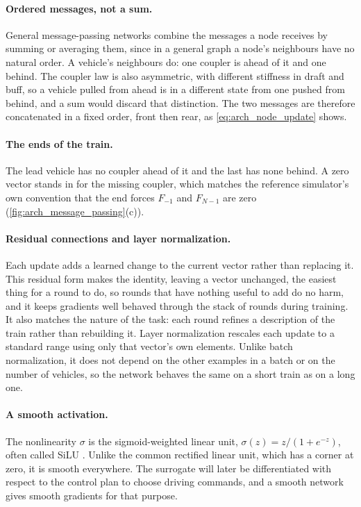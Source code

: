 \paragraph{Ordered messages, not a sum.} General message-passing networks combine the messages a node receives by summing or averaging them, since in a general graph a node's neighbours have no natural order. A vehicle's neighbours do: one coupler is ahead of it and one behind. The coupler law is also asymmetric, with different stiffness in draft and buff, so a vehicle pulled from ahead is in a different state from one pushed from behind, and a sum would discard that distinction. The two messages are therefore concatenated in a fixed order, front then rear, as \cref{eq:arch_node_update} shows.

\paragraph{The ends of the train.} The lead vehicle has no coupler ahead of it and the last has none behind. A zero vector stands in for the missing coupler, which matches the reference simulator's own convention that the end forces $F_{-1}$ and $F_{N-1}$ are zero (\cref{fig:arch_message_passing}(c)).

\paragraph{Residual connections and layer normalization.} Each update adds a learned change to the current vector rather than replacing it. This residual form \cite{he2016resnet} makes the identity, leaving a vector unchanged, the easiest thing for a round to do, so rounds that have nothing useful to add do no harm, and it keeps gradients well behaved through the stack of rounds during training. It also matches the nature of the task: each round refines a description of the train rather than rebuilding it. Layer normalization \cite{ba2016layernorm} rescales each update to a standard range using only that vector's own elements. Unlike batch normalization, it does not depend on the other examples in a batch or on the number of vehicles, so the network behaves the same on a short train as on a long one.

\paragraph{A smooth activation.} The nonlinearity $\sigma$ is the sigmoid-weighted linear unit, $\sigma(z) = z/(1 + e^{-z})$, often called SiLU \cite{elfwing2018silu}. Unlike the common rectified linear unit, which has a corner at zero, it is smooth everywhere. The surrogate will later be differentiated with respect to the control plan to choose driving commands, and a smooth network gives smooth gradients for that purpose.

